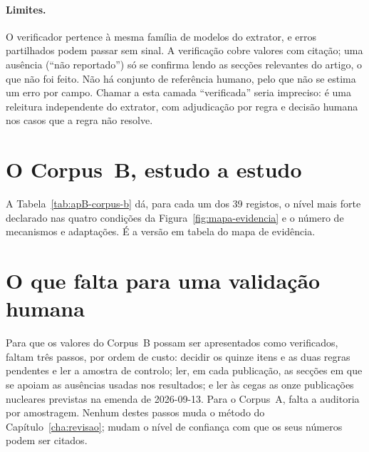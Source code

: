 \paragraph{Limites.} O verificador pertence à mesma família de modelos do
extrator, e erros partilhados podem passar sem sinal. A verificação cobre
valores com citação; uma ausência (``não reportado'') só se confirma lendo as
secções relevantes do artigo, o que não foi feito. Não há conjunto de
referência humano, pelo que não se estima um erro por campo. Chamar a esta
camada ``verificada'' seria impreciso: é uma releitura independente do
extrator, com adjudicação por regra e decisão humana nos casos que a regra
não resolve.

\section{O Corpus~B, estudo a estudo}
\label{sec:apB-tabela}

A Tabela~\ref{tab:apB-corpus-b} dá, para cada um dos 39 registos, o nível mais
forte declarado nas quatro condições da Figura~\ref{fig:mapa-evidencia} e o
número de mecanismos e adaptações. É a versão em tabela do mapa de evidência.



\section{O que falta para uma validação humana}
\label{sec:apB-falta}

Para que os valores do Corpus~B possam ser apresentados como verificados, faltam
três passos, por ordem de custo: decidir os quinze itens e as duas regras
pendentes e ler a amostra de controlo; ler, em cada publicação, as secções em
que se apoiam as ausências usadas nos resultados; e ler às cegas as onze
publicações nucleares previstas na emenda de 2026-09-13. Para o Corpus~A,
falta a auditoria por amostragem. Nenhum destes passos muda o método do
Capítulo~\ref{cha:revisao}; mudam o nível de confiança com que os seus
números podem ser citados.
